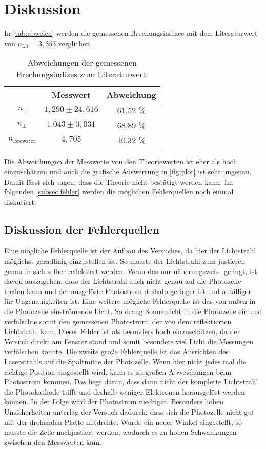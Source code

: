 \section{Diskussion}
\label{sec:Diskussion}

In \autoref{tab:abweich} werden die gemessenen Brechungsindizes mit dem Literaturwert von $n_{\text{Lit}}=3,353$ verglichen.
\begin{table}[H]
    \centering
    \caption{Abweichungen der gemessenen Brechungsindizes zum Literaturwert.}
    \label{tab:abweich}
    \begin{tabular}{c c c}
        \toprule
         & Messwert & Abweichung \\
        \midrule
        $n_{\parallel}$ & $1,290 \pm 24,616$ & 61,52 \% \\
        $n_\perp$ & $1.043 \pm 0,031$ & 68,89 \% \\
        $n_{\text{Brewster}}$ & $4,705$ & 40,32 \% \\
        \bottomrule
    \end{tabular}
\end{table}

\noindent
Die Abweichungen der Messwerte von den Theoriewerten ist eher als hoch einzuschätzen und auch die grafische Auswertung in \autoref{fig:plot} ist sehr
ungenau. Damit lässt sich sagen, dass die Theorie nicht bestätigt werden kann. Im folgenden \autoref{subsec:fehler} werden die möglichen Fehlerquellen noch einmal diskutiert.

\subsection{Diskussion der Fehlerquellen}
\label{subsec:fehler}

Eine mögliche Fehlerquelle ist der Aufbau des Versuches, da hier der Lichtstrahl möglichst geradlinig einzustellen ist. So musste der Lichtstrahl zum justieren genau in sich selber reflektiert
werden. Wenn das nur näherungsweise gelingt, ist davon auszugehen, dass der Lichtstrahl auch nicht genau auf die Photozelle treffen kann und der ausgelöste Photostrom deshalb geringer ist und
anfälliger für Ungenauigkeiten ist. \newline
Eine weitere mögliche Fehlerquelle ist das von außen in die Photozelle einströmende Licht. So drang Sonnenlicht in die Photozelle ein und verfälschte somit den gemessenen
Photostrom, der von dem reflektierten Lichtstrahl kam. Dieser Fehler ist als besonders hoch einzuschätzen, da der Versuch direkt am Fenster stand und somit besonders viel
Licht die Messungen verfälschen konnte. \newline
Die zweite große Fehlerquelle ist das Ausrichten des Laserstrahls auf die Spaltmitte der Photozelle. Wenn hier nicht jedes mal die richtige Position eingestellt wird, kann es zu großen
Abweichungen beim Photostrom kommen. Das liegt daran, dass dann nicht der komplette Lichtstrahl die Photokathode trifft und deshalb weniger Elektronen herausgelöst werden können.
In der Folge wird der Photostrom niedriger. Besonders hohen Unsicherheiten unterlag der Versuch dadurch, dass sich die Photozelle nicht gut mit der drehenden Platte mitdrehte.
Wurde ein neuer Winkel eingestellt, so musste die Zelle nachjustiert werden, wodurch es zu hohen Schwankungen zwischen den Messwerten kam.